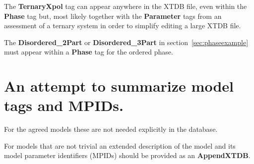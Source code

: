 \documentclass{article}
\begin{document}
\begin{appendices}
The {\bf TernaryXpol} tag can appear anywhere in the XTDB file, even
within the {\bf Phase} tag but, most likely together with the {\bf
  Parameter} tags from an assessment of a ternary system in order to
simplify editing a large XTDB file.  

The {\bf Disordered\_2Part} or {\bf Disordered\_3Part} in
section~\ref{sec:phaseexample} must appear within a {\bf Phase} tag
for the ordered phase.

\newpage 

\setcounter{equation}{0}
\renewcommand{\theequation}{B\arabic{equation}}
\setcounter{figure}{0}
\renewcommand{\thefigure}{B\arabic{figure}}

\section{An attempt to summarize model tags and MPIDs.}\label{sec:modelapp}

For the agreed models these are not needed explicitly in the database.

For models that are not trivial an extended description of the model
and its model parameter identifiers (MPIDs) should be provided as an
{\bf AppendXTDB}.


\end{appendices}
\end{document}
